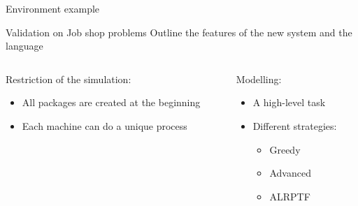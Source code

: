 \begin{frame}{Environment example}
    
\end{frame}

\begin{frame}{Validation on Job shop problems}
\centering
Outline the features of the new system and the language
\begin{columns}
    \begin{column}{0.5\textwidth}
        Restriction of the simulation:
        \begin{itemize}
            \item All packages are created at the beginning
            \item Each machine can do a unique process
        \end{itemize}
    \end{column}
    \begin{column}{0.5\textwidth}
        Modelling: 
        \begin{itemize}
            \item A high-level task
            \item Different strategies:
            \begin{itemize}
                \item Greedy
                \item Advanced
                \item ALRPTF
            \end{itemize}
        \end{itemize}
    \end{column}
\end{columns}
\end{frame}

\newcommand{\calcrowmean}{
    \def \rowmean{0}
    \pgfmathparse{\pgfkeysvalueof{/pgfplots/table/summary statistics/end index}-\pgfkeysvalueof{/pgfplots/table/summary statistics/start index}+1}
    \edef\numberofcols{\pgfmathresult}
    \pgfplotsforeachungrouped \col in {1,2,3,4,5,6,7,8,9,10}%
    {
        
        \typeout{col = \col}
        
        \pgfmathparse{\rowmean+\thisrowno{\col}/\numberofcols}
        \edef \rowmean{\pgfmathresult}
    }
}
\newcommand{\calcstddev}{
    \def\rowstddev{0}
    \calcrowmean
    \pgfplotsforeachungrouped \col in {1,2,3,4,5,6,7,8,9,10}
    {
        \pgfmathparse{\rowstddev+(\thisrowno{\col}-\rowmean)^2/(\numberofcols-1)}
        \edef\rowstddev{\pgfmathresult}
    }
    \pgfmathparse{sqrt(\rowstddev)}
}
\newcommand{\calcstderror}{
    \calcrowmean
    \calcstddev
    \pgfmathparse{sqrt(\rowstddev)/sqrt(\numberofcols)}
}

